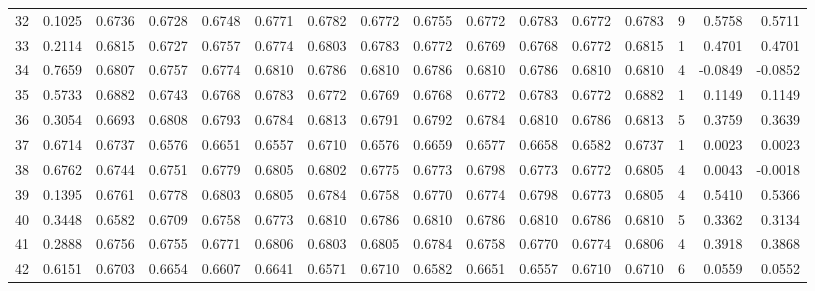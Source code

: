 \begin{tabular}{lrrrrrrrrrrrrrrr}
32  &      0.1025 &  0.6736 &  0.6728 &  0.6748 &  0.6771 &  0.6782 &  0.6772 &  0.6755 &  0.6772 &  0.6783 &   0.6772 &     0.6783 &      9 &                    0.5758 &                     0.5711 \\
33  &      0.2114 &  0.6815 &  0.6727 &  0.6757 &  0.6774 &  0.6803 &  0.6783 &  0.6772 &  0.6769 &  0.6768 &   0.6772 &     0.6815 &      1 &                    0.4701 &                     0.4701 \\
34  &      0.7659 &  0.6807 &  0.6757 &  0.6774 &  0.6810 &  0.6786 &  0.6810 &  0.6786 &  0.6810 &  0.6786 &   0.6810 &     0.6810 &      4 &                   -0.0849 &                    -0.0852 \\
35  &      0.5733 &  0.6882 &  0.6743 &  0.6768 &  0.6783 &  0.6772 &  0.6769 &  0.6768 &  0.6772 &  0.6783 &   0.6772 &     0.6882 &      1 &                    0.1149 &                     0.1149 \\
36  &      0.3054 &  0.6693 &  0.6808 &  0.6793 &  0.6784 &  0.6813 &  0.6791 &  0.6792 &  0.6784 &  0.6810 &   0.6786 &     0.6813 &      5 &                    0.3759 &                     0.3639 \\
37  &      0.6714 &  0.6737 &  0.6576 &  0.6651 &  0.6557 &  0.6710 &  0.6576 &  0.6659 &  0.6577 &  0.6658 &   0.6582 &     0.6737 &      1 &                    0.0023 &                     0.0023 \\
38  &      0.6762 &  0.6744 &  0.6751 &  0.6779 &  0.6805 &  0.6802 &  0.6775 &  0.6773 &  0.6798 &  0.6773 &   0.6772 &     0.6805 &      4 &                    0.0043 &                    -0.0018 \\
39  &      0.1395 &  0.6761 &  0.6778 &  0.6803 &  0.6805 &  0.6784 &  0.6758 &  0.6770 &  0.6774 &  0.6798 &   0.6773 &     0.6805 &      4 &                    0.5410 &                     0.5366 \\
40  &      0.3448 &  0.6582 &  0.6709 &  0.6758 &  0.6773 &  0.6810 &  0.6786 &  0.6810 &  0.6786 &  0.6810 &   0.6786 &     0.6810 &      5 &                    0.3362 &                     0.3134 \\
41  &      0.2888 &  0.6756 &  0.6755 &  0.6771 &  0.6806 &  0.6803 &  0.6805 &  0.6784 &  0.6758 &  0.6770 &   0.6774 &     0.6806 &      4 &                    0.3918 &                     0.3868 \\
42  &      0.6151 &  0.6703 &  0.6654 &  0.6607 &  0.6641 &  0.6571 &  0.6710 &  0.6582 &  0.6651 &  0.6557 &   0.6710 &     0.6710 &      6 &                    0.0559 &                     0.0552 \\

\end{tabular}
